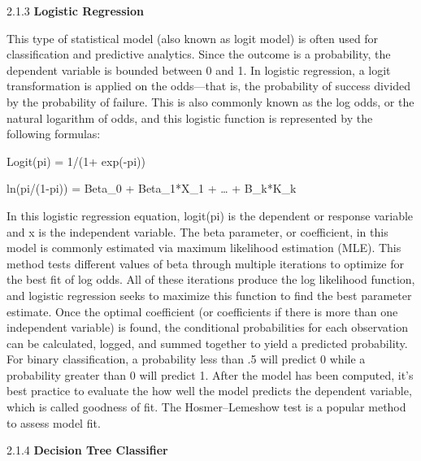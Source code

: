 \documentclass[a4paper]{article}
\theoremstyle{plain}
\theoremstyle{definition}
\begin{document}
2.1.3 \textbf{Logistic Regression\newline}

This type of statistical model (also known as logit model) is often used for classification and predictive analytics. Since the outcome is a probability, the dependent variable is bounded between 0 and 1. In logistic regression, a logit transformation is applied on the odds—that is, the probability of success divided by the probability of failure. This is also commonly known as the log odds, or the natural logarithm of odds, and this logistic function is represented by the following formulas: \newline

Logit(pi) = 1/(1+ exp(-pi))\newline

ln(pi/(1-pi)) = Beta_0 + Beta_1*X_1 + … + B_k*K_k\newline

In this logistic regression equation, logit(pi) is the dependent or response variable and x is the independent variable. The beta parameter, or coefficient, in this model is commonly estimated via maximum likelihood estimation (MLE). This method tests different values of beta through multiple iterations to optimize for the best fit of log odds. All of these iterations produce the log likelihood function, and logistic regression seeks to maximize this function to find the best parameter estimate. Once the optimal coefficient (or coefficients if there is more than one independent variable) is found, the conditional probabilities for each observation can be calculated, logged, and summed together to yield a predicted probability. For binary classification, a probability less than .5 will predict 0 while a probability greater than 0 will predict 1.  After the model has been computed, it’s best practice to evaluate the how well the model predicts the dependent variable, which is called goodness of fit. The Hosmer–Lemeshow test is a popular method to assess model fit.\newline

2.1.4\textbf{ Decision Tree Classifier\newline}
\end{document}
